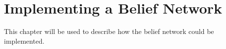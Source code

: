 \chapter{Implementing a Belief Network}
This chapter will be used to describe how the belief network could be
implemented.
